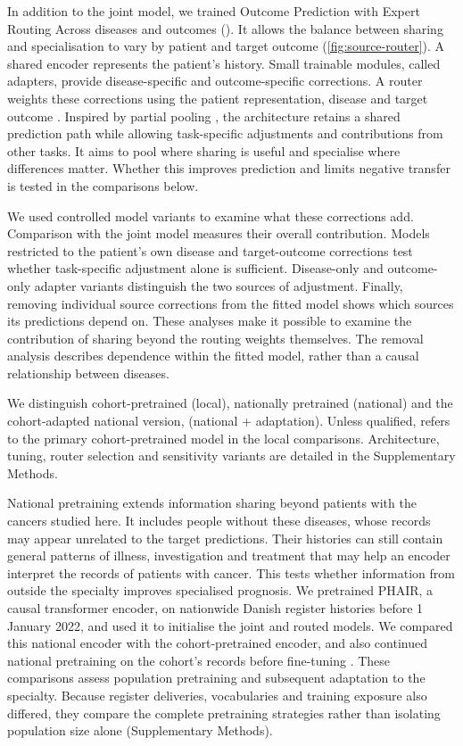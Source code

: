 In addition to the joint model, we trained Outcome Prediction with Expert
Routing Across diseases and outcomes (\opera{}). It allows the balance between
sharing and specialisation to vary by patient and target outcome
(\cref{fig:source-router}). A shared encoder represents the patient's history.
Small trainable modules, called adapters, provide disease-specific and
outcome-specific corrections. A router weights these corrections using the
patient representation, disease and target outcome
\citep{ma2018mmoe,houlsby2019adapters,hu2022lora}. Inspired by partial pooling
\citep{EfronMorris1975}, the architecture retains a shared prediction path while
allowing task-specific adjustments and contributions from other tasks. It aims
to pool where sharing is useful and specialise where differences matter.
Whether this improves prediction and limits negative transfer is tested in
the comparisons below.

We used controlled model variants to examine what these corrections add.
Comparison with the joint model measures their overall contribution. Models
restricted to the patient's own disease and target-outcome corrections test
whether task-specific adjustment alone is sufficient. Disease-only and
outcome-only adapter variants distinguish the two sources of adjustment.
Finally, removing individual source corrections from the fitted model shows
which sources its predictions depend on. These analyses make it possible to
examine the contribution of sharing beyond the routing weights themselves.
The removal analysis describes dependence within the fitted model, rather
than a causal relationship between diseases.

We distinguish cohort-pretrained \opera{} (local), nationally pretrained \opera{} (national)
and the cohort-adapted national version, \opera{} (national + adaptation). Unless qualified,
\opera{} refers to the primary cohort-pretrained model in the local comparisons.
Architecture, tuning, router selection and sensitivity variants are detailed
in the Supplementary Methods.

National pretraining extends information sharing beyond patients with the
cancers studied here. It includes people without these diseases, whose records
may appear unrelated to the target predictions. Their histories can still
contain general patterns of illness, investigation and treatment that may help
an encoder interpret the records of patients with cancer. This tests whether
information from outside the specialty improves specialised prognosis. We pretrained PHAIR, a causal transformer
encoder, on nationwide Danish register histories before 1 January 2022, and
used it to initialise the joint and routed models. We compared this national
encoder with the cohort-pretrained encoder, and also continued national
pretraining on the cohort's records before fine-tuning
\citep{gururangan2020dont}. These comparisons assess population pretraining
and subsequent adaptation to the specialty. Because register deliveries,
vocabularies and training exposure also differed, they compare the complete
pretraining strategies rather than isolating population size alone
(Supplementary Methods).

